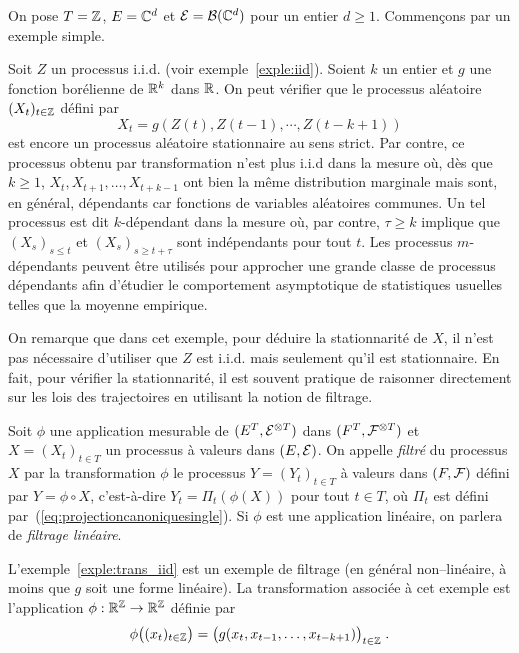 On pose $T=\mathbb{Z}$, $E=\mathbb{C}^d$ et $\mathcal{E}=\mathcal{B}(\mathbb{C}^d)$ pour un entier
$d\geq1$. Commen\c{c}ons par un exemple simple.


\begin{example}
\label{exple:trans_iid}
Soit $Z$ un processus i.i.d. (voir exemple~\ref{exple:iid}).
Soient $k$ un entier et $g$ une fonction bor\'elienne de $\mathbb{R}^k$
dans $\mathbb{R}$. On peut v\'erifier que le processus al\'eatoire
$(X_t)_{t\in\mathbb{Z}}$ d\'efini par
\[
 X_t= g(Z(t), Z(t-1), \cdots, Z(t-k+1))
\]
est encore un processus al\'eatoire stationnaire au sens strict.  Par contre, ce
processus obtenu par transformation n'est plus i.i.d dans la mesure o\`u, d\`es que
$k \geq 1$, $X_t, X_{t+1}, \dots, X_{t+k-1}$ ont bien la m\^{e}me distribution
marginale mais sont, en g\'en\'eral, d\'ependants car fonctions de variables
al\'eatoires communes. Un tel processus est dit $k$-d\'ependant dans la mesure o\`u,
par contre, $\tau \geq k$ implique que $(X_s)_{s\leq t}$ et $(X_s)_{s\geq
  t+\tau}$ sont ind\'ependants pour tout $t$. Les processus $m$-d\'ependants
peuvent \^{e}tre utilis\'es pour approcher une grande classe de processus d\'ependants
afin d'\'etudier le comportement asymptotique de statistiques usuelles telles que
la moyenne empirique.  
\end{example}

On remarque que dans cet exemple, pour d\'eduire la stationnarit\'e de $X$, il
n'est pas n\'ecessaire d'utiliser que $Z$ est i.i.d. mais seulement qu'il est
stationnaire. En fait, pour v\'erifier la stationnarit\'e, il est souvent pratique
de raisonner directement sur les lois des trajectoires en utilisant la notion
de filtrage.

\begin{definition}
  Soit $\phi$ une application mesurable de $(E^T,\mathcal{E}^{\otimes T})$
  dans $(F^T,\mathcal{F}^{\otimes T})$ et $X=(X_t)_{t\in T}$ un processus \`a valeurs dans $(E,\mathcal{E})$.
  On appelle \emph{filtr\'e} du processus $X$ par la transformation $\phi$ le
  processus $Y=(Y_t)_{t\in T}$ \`a valeurs dans $(F,\mathcal{F})$ d\'efini par
  $Y=\phi\circ X$, c'est-\`a-dire $Y_t=\Pi_t(\phi( X))$ pour tout $t\in
  T$, o\`u $\Pi_t$ est d\'efini par~(\ref{eq:projectioncanoniquesingle}). Si
  $\phi$ est une application lin\'eaire, on parlera de \emph{filtrage lin\'eaire}.
\end{definition}

L'exemple~\ref{exple:trans_iid} est un exemple de filtrage (en g\'en\'eral
non--lin\'eaire, \`a moins que $g$ soit une forme lin\'eaire).  La transformation
associ\'ee \`a cet exemple est l'application $\phi:\mathbb{R}^{\mathbb{Z}}\to\mathbb{R}^{\mathbb{Z}}$
d\'efinie par
$$
\phi\big((x_t)_{t\in\mathbb{Z}}\big)=
\big(g(x_t,x_{t-1},\dots,x_{t-k+1})\big)_{t\in\mathbb{Z}}\;.
$$


